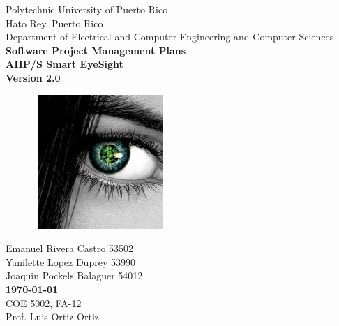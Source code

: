 \documentclass[12pt]{article}
\begin{document}
\begin{titlepage}
 \centering
 Polytechnic University of Puerto Rico\\
 Hato Rey, Puerto Rico\\
 Department of Electrical and Computer Engineering and Computer Sciences\\
    \vspace*{10\baselineskip}
    \large
    \bfseries
    Software Project Management Plans  \\
    AIIP/S Smart EyeSight\\
    Version 2.0\\[2\baselineskip]
     \begin{figure}[H]\centering
  \includegraphics[width=2in,height=2in]{images/aippsLogo_official}\\
  \end{figure}
    \normalfont
     \vfill
    Emanuel Rivera Castro 53502\\
    Yanilette Lopez Duprey 53990\\
    Joaquin Pockels Balaguer 54012\\[2\baselineskip]

    \textbf{\today} \\
    COE 5002, FA-12\\
    Prof. Luis Ortiz Ortiz\\[2\baselineskip]
\end{titlepage}
\end{document}
